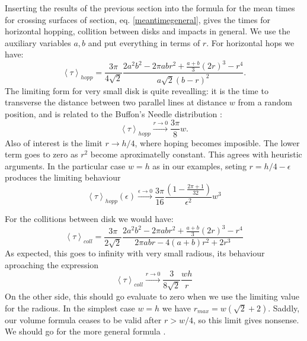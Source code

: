 \documentclass[a4paper,10pt, jcp, aps, preprint]{revtex4-1}
\newcommand{\mean}[1]{\left \langle #1 \right \rangle}
\begin{document}
Inserting the results of the previous section 
into the formula for the mean times for crossing
surfaces of section, eq. \ref{meantimegeneral}, gives the times for 
horizontal hopping, 
collition between disks and impacts in general. We use the auxiliary
variables $a,b$ and put everything in terms of $r$. For horizontal
hops we have:
\begin{equation}\label{hoptau}
 \mean{\tau}_{hopp} = 	
\frac{3 \pi}{4\sqrt{2}}
\frac{2 a^{2} b^{2}  - 2 \pi a b r^{2} + \textstyle \frac{a+b}{3}  (2r)^{3}  -  r^4}
{ a \sqrt{2}  ( b - r )^2}.
\end{equation}
The limiting form for very small disk is quite revealling: it is the time
to transverse the distance between two parallel lines at distance $w$ from
a random position, and is related to the Buffon's Needle distribution 
\cite{EScheinerman}:
\begin{equation}\label{hoptaulimit}
 \mean{\tau}_{hopp} \xrightarrow{r\rightarrow 0} 	
\frac{3 \pi}{8}w.
\end{equation}
Also of interest is the limit $r\rightarrow h/4$, where hoping becomes
imposible. The lower term goes to zero as $r^2$ become aproximatelly constant.
This agrees with heuristic arguments. 
In the particular case $w=h$ as in our examples,
seting $r=h/4-\epsilon$ produces the limiting behaviour 
\begin{equation}
 \mean{\tau}_{hopp}(\epsilon) \xrightarrow{\epsilon\rightarrow 0} 	
\frac{3 \pi}{16}
\frac{(1-\frac{2\pi+1}{32})}
{ \epsilon^2} w^3
\end{equation} 


For the collitions between disk we would have:
\begin{equation}\label{colltau}
 \mean{\tau}_{coll} = 	
\frac{3 \pi}{2\sqrt{2}}
\frac {2 a^{2} b^{2}  - 2 \pi a b r^{2} + \textstyle \frac{a+b}{3}  (2r)^{3}  -  r^4}
{2\pi a b r -4(a+b)r^2+2r^3}
\end{equation}
As expected, this goes to infinity with very small radious, its behaviour
aproaching the expression
\begin{equation}\label{colltaulim0}
\mean{\tau}_{coll}  \xrightarrow{r\rightarrow 0} 
\frac{3}{8\sqrt{2}}\frac{wh}{r}
\end{equation}
On the other side, this should go evaluate to zero when
we use the limiting value for the radious. In the simplest
case  $w = h$ we have $r_{max}= w(\sqrt{2}+2)$. Saddly, our volume
formula ceases to be valid after $r>w/4$, so this limit gives nonsense.
We should go for the more general formula \cite{notascalculokarel}.
\end{document}
